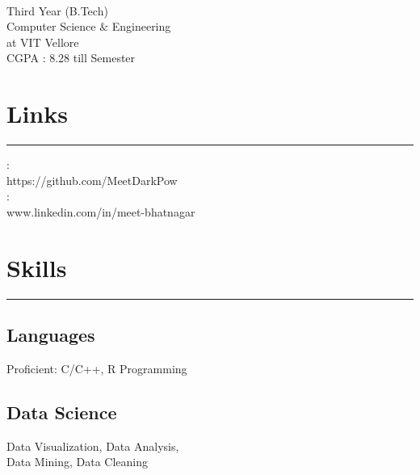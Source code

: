 \documentclass[]{meetresume-class}
\begin{document}
	
	
	\begin{minipage}[t]{0.33\textwidth} 
		\begin{large}
			\\
		\end{large}
		Third Year (B.Tech)\\
		Computer Science $\&$ Engineering\\ 
		at VIT Vellore \\ 
		CGPA : 8.28 till  Semester 
		
		\section{Links} 
		\noindent\rule{5cm}{0.6pt}
		
		\href{https://github.com/MeetDarkPow}{}:\\
		https://github.com/MeetDarkPow \\
		\href{https://www.linkedin.com/in/meet-bhatnagar-a41842181/}{}:\\
		www.linkedin.com/in/meet-bhatnagar
		\sectionsep
		\section{Skills}
		\noindent\rule{5cm}{0.6pt}
	
		
		\subsection{Languages}
		Proficient: C/C++, R Programming
		\vspace{6pt}
		
		\subsection{Data Science}
		Data Visualization, Data Analysis,\\
		Data Mining, Data Cleaning
		\vspace{6pt}
		

\end{minipage}
\end{document}
